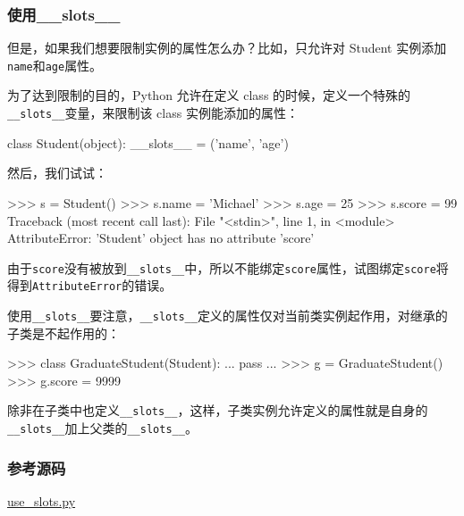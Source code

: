 \hypertarget{ux4f7fux7528__slots__-1}{%
\subsubsection{使用\_\_slots\_\_}\label{ux4f7fux7528__slots__-1}}

但是，如果我们想要限制实例的属性怎么办？比如，只允许对 Student
实例添加\texttt{name}和\texttt{age}属性。

为了达到限制的目的，Python 允许在定义 class
的时候，定义一个特殊的\texttt{\_\_slots\_\_}变量，来限制该 class
实例能添加的属性：

\begin{pythoncode}
class Student(object):
    __slots__ = ('name', 'age') 
\end{pythoncode}

然后，我们试试：

\begin{pythoncode}
>>> s = Student() 
>>> s.name = 'Michael' 
>>> s.age = 25 
>>> s.score = 99 
Traceback (most recent call last):
  File "<stdin>", line 1, in <module>
AttributeError: 'Student' object has no attribute 'score'
\end{pythoncode}

由于\texttt{\textquotesingle{}score\textquotesingle{}}没有被放到\texttt{\_\_slots\_\_}中，所以不能绑定\texttt{score}属性，试图绑定\texttt{score}将得到\texttt{AttributeError}的错误。

使用\texttt{\_\_slots\_\_}要注意，\texttt{\_\_slots\_\_}定义的属性仅对当前类实例起作用，对继承的子类是不起作用的：

\begin{pythoncode}
>>> class GraduateStudent(Student):
...     pass
...
>>> g = GraduateStudent()
>>> g.score = 9999
\end{pythoncode}

除非在子类中也定义\texttt{\_\_slots\_\_}，这样，子类实例允许定义的属性就是自身的\texttt{\_\_slots\_\_}加上父类的\texttt{\_\_slots\_\_}。

\hypertarget{ux53c2ux8003ux6e90ux7801}{%
\subsubsection{参考源码}\label{ux53c2ux8003ux6e90ux7801}}

\href{https://github.com/michaelliao/learn-python3/blob/master/samples/oop_advance/use_slots.py}{use\_slots.py}

